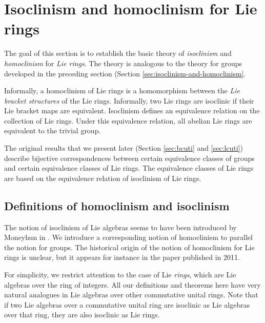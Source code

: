 \documentclass{ucetd}
\begin{document}
\section{Isoclinism and homoclinism for Lie rings}\label{sec:isoclinism-and-homoclinism-lie}

The goal of this section is to establish the basic theory of {\em
  isoclinism} and {\em homoclinism} for {\em Lie rings}. The theory is
analogous to the theory for groups developed in the preceding section
(Section \ref{sec:isoclinism-and-homoclinism}. 

Informally, a homoclinism of Lie rings is a homomorphism between the
{\em Lie bracket structures} of the Lie rings. Informally, two Lie
rings are isoclinic if their Lie bracket maps are
equivalent. Isoclinism defines an equivalence relation on the
collection of Lie rings. Under this equivalence relation, all abelian
Lie rings are equivalent to the trivial group.

The original results that we present later (Section \ref{sec:bcuti}
and \ref{sec:lcuti}) describe bijective correspondences between
certain equivalence classes of groups and certain equivalence classes
of Lie rings. The equivalence classes of Lie rings are based on the
equivalence relation of isoclinism of Lie rings.

\subsection{Definitions of homoclinism and isoclinism}\label{sec:isoclinism-definition-lie}

The notion of isoclinism of Lie algebras seems to have been introduced
by Moneyhun in \cite{Moneyhun}. We introduce a corresponding notion of
homoclinism to parallel the notion for groups. The historical origin
of the notion of homoclinism for Lie rings is unclear, but it appears
for instance in the paper \cite{Moghaddametal} published in 2011.

For simplicity, we restrict attention to the case of Lie {\em rings},
which are Lie algebras over the ring of integers. All our definitions
and theorems here have very natural analogues in Lie algebras over
other commutative unital rings. Note that if two Lie algebras over a
commutative unital ring are isoclinic as Lie algebras over that ring,
they are also isoclinic as Lie rings. %
\end{document}
